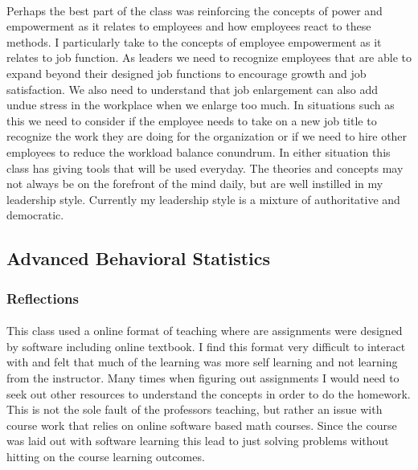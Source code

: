 \documentclass[12pt,titlepage]{article}
\begin{document}
\paragraph {}
Perhaps the best part of the class was reinforcing the concepts of power and empowerment as it relates to employees and how employees react to these methods. I particularly take to the concepts of employee empowerment as it relates to job function. As leaders we need to recognize employees that are able to expand beyond their designed job functions to encourage growth and job satisfaction. We also need to understand that job enlargement can also add undue stress in the workplace when we enlarge too much. In situations such as this we need to consider if the employee needs to take on a new job title to recognize the work they are doing for the organization or if we need to hire other employees to reduce the workload balance conundrum. In either situation this class has giving tools that will be used everyday. The theories and concepts may not always be on the forefront of the mind daily, but are well instilled in my leadership style. Currently my leadership style is a mixture of authoritative and democratic. %

\restoregeometry



\restoregeometry


\subsection{Advanced Behavioral Statistics}
\subsubsection{Reflections}
\paragraph {}
This class used a online format of teaching where are assignments were designed by software including online textbook. I find this format very difficult to interact with and felt that much of the learning was more self learning and not learning from the instructor. Many times when figuring out assignments I would need to seek out other resources to understand the concepts in order to do the homework. This is not the sole fault of the professors teaching, but rather an issue with course work that relies on online software based math courses. Since the course was laid out with software learning this lead to just solving problems without hitting on the course learning outcomes.
\end{document}
